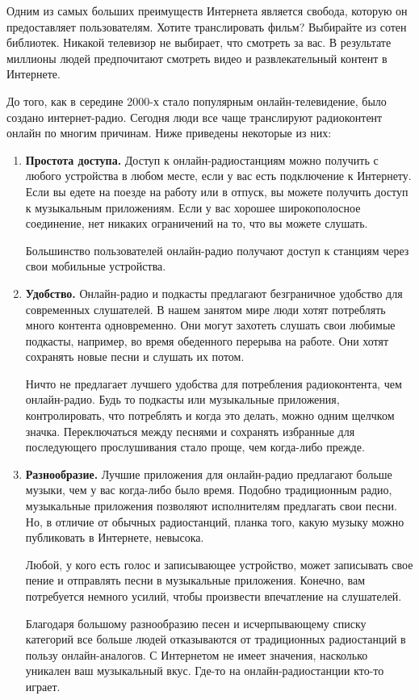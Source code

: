 Одним из самых больших преимуществ Интернета является свобода, которую он предоставляет пользователям. Хотите транслировать фильм? Выбирайте из сотен библиотек. Никакой телевизор не выбирает, что смотреть за вас. В результате миллионы людей предпочитают смотреть видео и развлекательный контент в Интернете.

До того, как в середине 2000-х стало популярным онлайн-телевидение, было создано интернет-радио. Сегодня люди все чаще транслируют радиоконтент онлайн по многим причинам. Ниже приведены некоторые из них:

\begin{enumerate}
  \item \textbf{Простота доступа.}
        Доступ к онлайн-радиостанциям можно получить с любого устройства в любом месте, если у вас есть подключение к Интернету. Если вы едете на поезде на работу или в отпуск, вы можете получить доступ к музыкальным приложениям. Если у вас хорошее широкополосное соединение, нет никаких ограничений на то, что вы можете слушать.

        Большинство пользователей онлайн-радио получают доступ к станциям через свои мобильные устройства.
  \item \textbf{Удобство.}
        Онлайн-радио и подкасты предлагают безграничное удобство для современных слушателей. В нашем занятом мире люди хотят потреблять много контента одновременно. Они могут захотеть слушать свои любимые подкасты, например, во время обеденного перерыва на работе. Они хотят сохранять новые песни и слушать их потом.

        Ничто не предлагает лучшего удобства для потребления радиоконтента, чем онлайн-радио. Будь то подкасты или музыкальные приложения, контролировать, что потреблять и когда это делать, можно одним щелчком значка. Переключаться между песнями и сохранять избранные для последующего прослушивания стало проще, чем когда-либо прежде.
  \item \textbf{Разнообразие.}
        Лучшие приложения для онлайн-радио предлагают больше музыки, чем у вас когда-либо было время. Подобно традиционным радио, музыкальные приложения позволяют исполнителям предлагать свои песни. Но, в отличие от обычных радиостанций, планка того, какую музыку можно публиковать в Интернете, невысока.

        Любой, у кого есть голос и записывающее устройство, может записывать свое пение и отправлять песни в музыкальные приложения. Конечно, вам потребуется немного усилий, чтобы произвести впечатление на слушателей.

        Благодаря большому разнообразию песен и исчерпывающему списку категорий все больше людей отказываются от традиционных радиостанций в пользу онлайн-аналогов. С Интернетом не имеет значения, насколько уникален ваш музыкальный вкус. Где-то на онлайн-радиостанции кто-то играет.
\end{enumerate}
